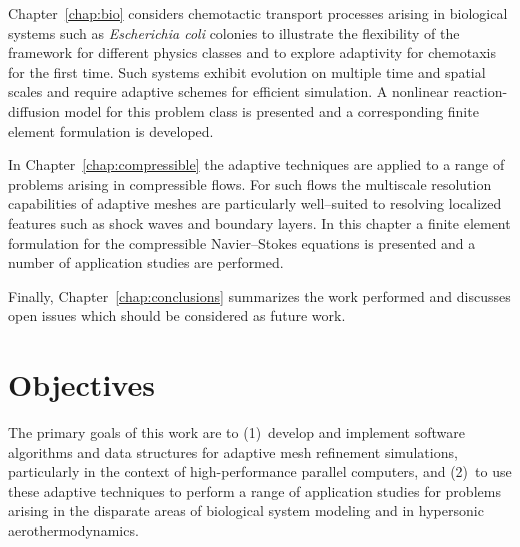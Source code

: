 
Chapter~\ref{chap:bio} considers chemotactic transport processes arising in biological systems such as \emph{Escherichia coli} colonies to illustrate the flexibility of the framework for different physics classes and to explore adaptivity for chemotaxis for the first time.  Such systems exhibit evolution on multiple time and spatial scales and require adaptive schemes for efficient simulation. A nonlinear reaction-diffusion model for this problem class is presented and a corresponding finite element formulation is developed.  

In Chapter~\ref{chap:compressible} the adaptive techniques are applied to a range of problems arising in compressible flows.  For such flows the multiscale resolution capabilities of adaptive meshes are particularly well--suited to resolving localized features such as shock waves and boundary layers.  In this chapter a finite element formulation for the compressible Navier--Stokes equations is presented and a number of application studies are performed.

Finally, Chapter~\ref{chap:conclusions} summarizes the work performed and discusses open issues which should be considered as future work.

\section{Objectives}
The primary goals of this work are to (1)~develop and implement software algorithms and data structures for adaptive mesh refinement simulations, particularly in the context of high-performance parallel computers, and (2)~to use these adaptive techniques to perform a range of application studies for problems arising in the disparate areas of biological system modeling and in hypersonic aerothermodynamics. 

